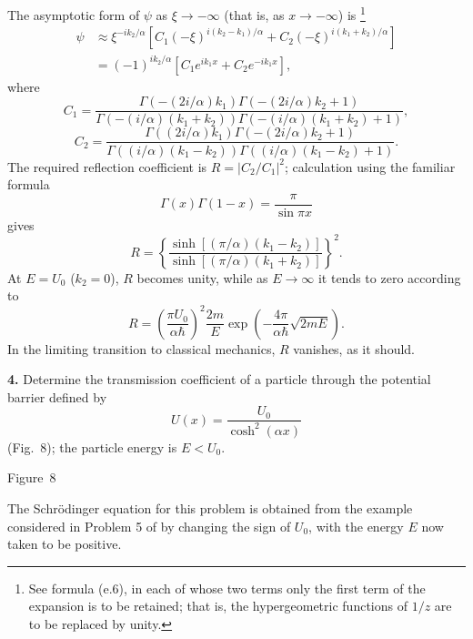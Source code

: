 The asymptotic form of $\psi$ as $\xi\to-\infty$ (that is, as
$x\to-\infty$) is
\footnote{See formula (e.6), in each of whose two terms only the first term
of the expansion is to be retained; that is, the hypergeometric functions
of $1/z$ are to be replaced by unity.}
\[
  \begin{aligned}
  \psi&\approx\xi^{-ik_2/\alpha}
  \left[C_1(-\xi)^{i(k_2-k_1)/\alpha}
       +C_2(-\xi)^{i(k_1+k_2)/\alpha}\right]\\
  &=(-1)^{ik_2/\alpha}\left[C_1e^{ik_1x}+C_2e^{-ik_1x}\right],
  \end{aligned}
\]
where
\[
  C_1=\frac{\Gamma(-(2i/\alpha)k_1)\Gamma(-(2i/\alpha)k_2+1)}
  {\Gamma(-(i/\alpha)(k_1+k_2))
   \Gamma(-(i/\alpha)(k_1+k_2)+1)},
\]
\[
  C_2=\frac{\Gamma((2i/\alpha)k_1)\Gamma(-(2i/\alpha)k_2+1)}
  {\Gamma((i/\alpha)(k_1-k_2))
   \Gamma((i/\alpha)(k_1-k_2)+1)}.
\]
The required reflection coefficient is $R=|C_2/C_1|^2$; calculation using
the familiar formula
\[
  \Gamma(x)\Gamma(1-x)=\frac{\pi}{\sin\pi x}
\]
gives
\[
  R=\left\{
  \frac{\sinh[(\pi/\alpha)(k_1-k_2)]}
       {\sinh[(\pi/\alpha)(k_1+k_2)]}
  \right\}^2.
\]
At $E=U_0$ ($k_2=0$), $R$ becomes unity, while as $E\to\infty$ it tends
to zero according to
\[
  R=\left(\frac{\pi U_0}{\alpha\hbar}\right)^2
  \frac{2m}{E}\exp\left(-\frac{4\pi}{\alpha\hbar}\sqrt{2mE}\right).
\]
In the limiting transition to classical mechanics, $R$ vanishes, as it
should.

\ProblemHeading
\textbf{4.} Determine the transmission coefficient of a particle through
the potential barrier defined by
\[
  U(x)=\frac{U_0}{\cosh^2(\alpha x)}
\]
(Fig.~8); the particle energy is $E<U_0$.

\begin{center}

\small Figure~8
\end{center}

\SolutionHeading
The Schrödinger equation for this problem is obtained from the example
considered in Problem 5 of  by changing the sign of $U_0$, with the
energy $E$ now taken to be positive.


